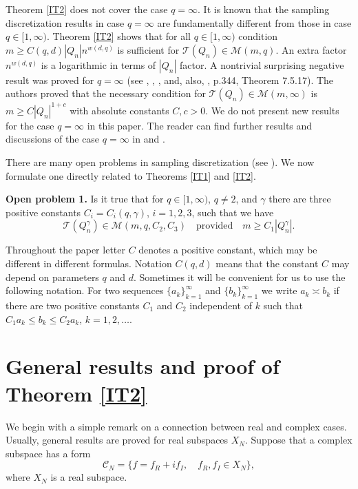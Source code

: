 \documentclass[12pt]{article}
\def\cC{{\mathcal C}}
\def \Tr{\mathcal T}
\def \cM{\mathcal M}
\def\ga{\gamma}
\numberwithin{equation}{section}
\begin{document}
Theorem \ref{IT2} does not cover the case $q=\infty$. It is known that the sampling discretization results in case $q=\infty$ are fundamentally different from those in case $q\in [1,\infty)$. Theorem \ref{IT2} shows that for all $q\in [1,\infty)$ condition $m\ge C(q,d)|Q_n|n^{w(d,q)}$ is sufficient for $\Tr(Q_n) \in \cM(m,q)$. An extra factor $n^{w(d,q)}$ is a logarithmic 
in terms of $|Q_n|$ factor. A nontrivial surprising negative result was proved for $q=\infty$ (see \cite{KT3}, \cite{KT4}, \cite{KaTe03}, and, also, \cite{VTbookMA}, p.344, Theorem 7.5.17). The authors proved that the necessary condition for
$\Tr(Q_n)\in\cM(m,\infty)$ is $m\ge C|Q_n|^{1+c}$ with absolute constants $C,c>0$. We do not present new results for the case $q=\infty$ in this paper. The reader can find further results and 
discussions of the case $q=\infty$ in \cite{DPTT} and \cite{VT168}.

There are many open problems in sampling discretization (see \cite{DPTT}). We now formulate
one directly related to Theorems \ref{IT1} and \ref{IT2}.

{\bf Open problem 1.}  Is it true that for $q\in [1,\infty)$, $q\neq 2$, and $\ga$ there are three positive constants  
$C_i=C_i(q,\ga)$, $i=1,2,3$, such that we have 
$$
\Tr(Q_n^\ga) \in \cM(m,q,C_2,C_3)\quad \text{provided}\quad m\ge C_1|Q_n^\ga|.
$$

Throughout the paper letter $C$ denotes a positive constant, which may be different in different formulas. Notation $C(q,d)$ means that the constant $C$ may depend on parameters $q$ and $d$. 
Sometimes it will be convenient for us to use the following notation. For two sequences $\{a_k\}_{k=1}^\infty$ and $\{b_k\}_{k=1}^\infty$ we write $a_k \asymp b_k$ if there are two positive constants $C_1$ and $C_2$ independent of $k$ such that $C_1a_k \le b_k\le C_2 a_k$, $k=1,2,\dots$. 

\section{General results and proof of Theorem \ref{IT2}}
\label{A}

We begin with a simple remark on a connection between real and complex cases. Usually, 
general results are proved for real subspaces $X_N$. Suppose that a complex subspace 
has a form
$$
\cC_N = \{f = f_R + if_I,\quad f_R, f_I \in X_N\},
$$
where $X_N$ is a real subspace. 
\end{document}
